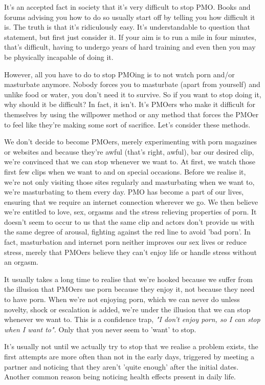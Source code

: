 \documentclass[easypeasy.tex]{subfiles}
\begin{document}
It's an accepted fact in society that it's very difficult to stop PMO. Books and forums advising you how to do so usually start off by telling you how difficult it is. The truth is that it's ridiculously easy. It's understandable to question that statement, but first just consider it. If your aim is to run a mile in four minutes, that's difficult, having to undergo years of hard training and even then you may be physically incapable of doing it.

However, all you have to do to stop PMOing is to not watch porn and/or masturbate anymore. Nobody forces you to masturbate (apart from yourself) and unlike food or water, you don't need it to survive. So if you want to stop doing it, why should it be difficult? In fact, it isn't. It's PMOers who make it difficult for themselves by using the willpower method or any method that forces the PMOer to feel like they're making some sort of sacrifice. Let's consider these methods.

We don't decide to become PMOers, merely experimenting with porn magazines or websites and because they're awful (that's right, awful), bar our desired clip, we're convinced that we can stop whenever we want to. At first, we watch those first few clips when we want to and on special occasions. Before we realise it, we're not only visiting those sites regularly and masturbating when we want to, we're masturbating to them every day. PMO has become a part of our lives, ensuring that we require an internet connection wherever we go. We then believe we're entitled to love, sex, orgasms and the stress relieving properties of porn. It doesn't seem to occur to us that the same clip and actors don't provide us with the same degree of arousal, fighting against the red line to avoid 'bad porn'. In fact, masturbation and internet porn neither improves our sex lives or reduce stress, merely that PMOers believe they can't enjoy life or handle stress without an orgasm.

It usually takes a long time to realise that we're hooked because we suffer from the illusion that PMOers use porn because they enjoy it, not because they need to have porn. When we're not enjoying porn, which we can never do unless novelty, shock or escalation is added, we're under the illusion that we can stop whenever we want to. This is a confidence trap, \textit{"I don't enjoy porn, so I can stop when I want to".} Only that you never seem to 'want' to stop.

It's usually not until we actually try to stop that we realise a problem exists, the first attempts are more often than not in the early days, triggered by meeting a partner and noticing that they aren't 'quite enough' after the initial dates. Another common reason being noticing health effects present in daily life.
\end{document}
